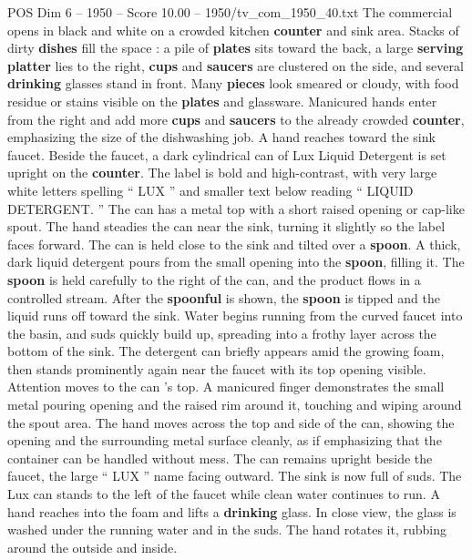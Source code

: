 \begin{textsample}{POS Dim 6 – 1950 – Score 10.00 – 1950/tv\_com\_1950\_40.txt}  \label{ex:f6_pos_019}
The commercial opens in black and white on a crowded kitchen \textbf{counter} and sink area.
Stacks of dirty \textbf{dishes} fill the space : a pile of \textbf{plates} sits toward the back, a large \textbf{serving} \textbf{platter} lies to the right, \textbf{cups} and \textbf{saucers} are clustered on the side, and several \textbf{drinking} glasses stand in front.
Many \textbf{pieces} look smeared or cloudy, with food residue or stains visible on the \textbf{plates} and glassware.
Manicured hands enter from the right and add more \textbf{cups} and \textbf{saucers} to the already crowded \textbf{counter}, emphasizing the size of the dishwashing job.
A hand reaches toward the sink faucet.
Beside the faucet, a dark cylindrical can of Lux Liquid Detergent is set upright on the \textbf{counter}.
The label is bold and high-contrast, with very large white letters spelling “ LUX ” and smaller text below reading “ LIQUID DETERGENT. ” The can has a metal top with a short raised opening or cap-like spout.
The hand steadies the can near the sink, turning it slightly so the label faces forward.
The can is held close to the sink and tilted over a \textbf{spoon}.
A thick, dark liquid detergent pours from the small opening into the \textbf{spoon}, filling it.
The \textbf{spoon} is held carefully to the right of the can, and the product flows in a controlled stream.
After the \textbf{spoonful} is shown, the \textbf{spoon} is tipped and the liquid runs off toward the sink.
Water begins running from the curved faucet into the basin, and suds quickly build up, spreading into a frothy layer across the bottom of the sink.
The detergent can briefly appears amid the growing foam, then stands prominently again near the faucet with its top opening visible.
Attention moves to the can ’s top.
A manicured finger demonstrates the small metal pouring opening and the raised rim around it, touching and wiping around the spout area.
The hand moves across the top and side of the can, showing the opening and the surrounding metal surface cleanly, as if emphasizing that the container can be handled without mess.
The can remains upright beside the faucet, the large “ LUX ” name facing outward.
The sink is now full of suds.
The Lux can stands to the left of the faucet while clean water continues to run.
A hand reaches into the foam and lifts a \textbf{drinking} glass.
In close view, the glass is washed under the running water and in the suds.
The hand rotates it, rubbing around the outside and inside.

\end{textsample}
